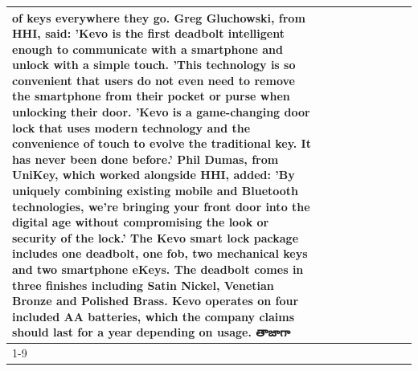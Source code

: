 \begin{table}[H]
\begin{tabular}{lllrlllll}
of keys everywhere they go. Greg Gluchowski, from HHI, said: 'Kevo is the first deadbolt intelligent enough to communicate with a smartphone and unlock with a simple touch. 'This technology is so convenient that users do not even need to remove the smartphone from their pocket or purse when unlocking their door. 'Kevo is a game-changing door lock that uses modern technology and the convenience of touch to evolve the traditional key. It has never been done before.' Phil Dumas, from UniKey, which worked alongside HHI, added: 'By uniquely combining existing mobile and Bluetooth technologies, we’re bringing your front door into the digital age without compromising the look or security of the lock.' The Kevo smart lock package includes one deadbolt, one fob, two mechanical keys and two smartphone eKeys. The deadbolt comes in three finishes including Satin Nickel, Venetian Bronze and Polished Brass. Kevo operates on four included AA batteries, which the company claims should last for a year depending on usage. తాజాగా \\
\cline{1-9}

\end{tabular}
\end{table}
